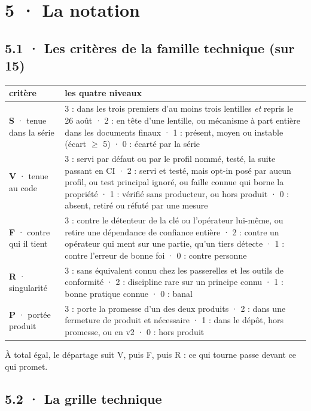 \documentclass[10pt]{article}
\begin{document}
\section{5 · La notation}

\subsection{5.1 · Les critères de la famille technique (sur 15)}

{\small
\renewcommand{\arraystretch}{1.15}
\begin{longtable}{@{}L{3.6cm}L{13.6cm}@{}}
\toprule
\textbf{critère} & \textbf{les quatre niveaux} \\ \midrule \endhead
\textbf{S} · tenue dans la série & 3 : dans les trois premiers d'au moins trois lentilles \emph{et} repris le 26 août · 2 : en tête d'une lentille, ou mécanisme à part entière dans les documents finaux · 1 : présent, moyen ou instable (écart $\geq$ 5) · 0 : écarté par la série \\
\textbf{V} · tenue au code & 3 : servi par défaut ou par le profil nommé, testé, la suite passant en CI · 2 : servi et testé, mais opt-in posé par aucun profil, ou test principal ignoré, ou faille connue qui borne la propriété · 1 : vérifié sans producteur, ou hors produit · 0 : absent, retiré ou réfuté par une mesure \\
\textbf{F} · contre qui il tient & 3 : contre le détenteur de la clé ou l'opérateur lui-même, ou retire une dépendance de confiance entière · 2 : contre un opérateur qui ment sur une partie, qu'un tiers détecte · 1 : contre l'erreur de bonne foi · 0 : contre personne \\
\textbf{R} · singularité & 3 : sans équivalent connu chez les passerelles et les outils de conformité · 2 : discipline rare sur un principe connu · 1 : bonne pratique connue · 0 : banal \\
\textbf{P} · portée produit & 3 : porte la promesse d'un des deux produits · 2 : dans une fermeture de produit et nécessaire · 1 : dans le dépôt, hors promesse, ou en v2 · 0 : hors produit \\
\bottomrule
\end{longtable}
}

À total égal, le départage suit V, puis F, puis R : ce qui tourne passe devant ce qui promet.

\subsection{5.2 · La grille technique}
\end{document}
